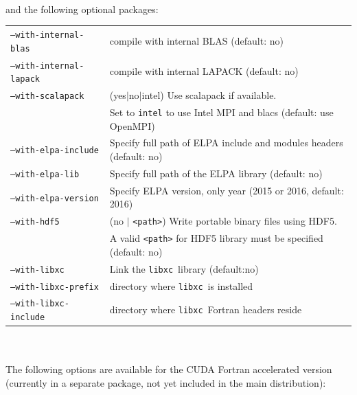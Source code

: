 \documentclass[12pt,a4paper]{article}
\def\libxc{\texttt{libxc}}
\begin{document}
\\
and the following optional packages:\\
\begin{tabular}{ll}
\texttt{--with-internal-blas}&    compile with internal BLAS (default: no)\\
\texttt{--with-internal-lapack}&  compile with internal LAPACK (default: no)\\
\texttt{--with-scalapack}&        (yes$|$no$|$intel) Use scalapack if available. \\
      &Set to \texttt{intel} to use Intel MPI and blacs (default: use OpenMPI)\\
\texttt{--with-elpa-include}&   Specify full path of ELPA include and modules
  headers (default: no)\\
\texttt{--with-elpa-lib}& Specify full path of the ELPA library
	                          (default: no)\\
\texttt{--with-elpa-version}& Specify ELPA version, only year (2015 or 2016,
	                          default: 2016)\\
\texttt{--with-hdf5}&  (no $|$ \texttt{<path>}) Write portable binary files using HDF5.\\
   & A valid \texttt{<path>} for HDF5 library must be specified (default: no)\\
\texttt{--with-libxc}        & Link the \libxc\ library (default:no) \\
\texttt{--with-libxc-prefix} & directory where \libxc\ is installed \\
\texttt{--with-libxc-include}& directory where \libxc\ Fortran headers reside\\
\end{tabular}\\
\\
The following options are available for the CUDA Fortran accelerated version
(currently in a separate package, not yet included in the main distribution):\\
\end{document}
